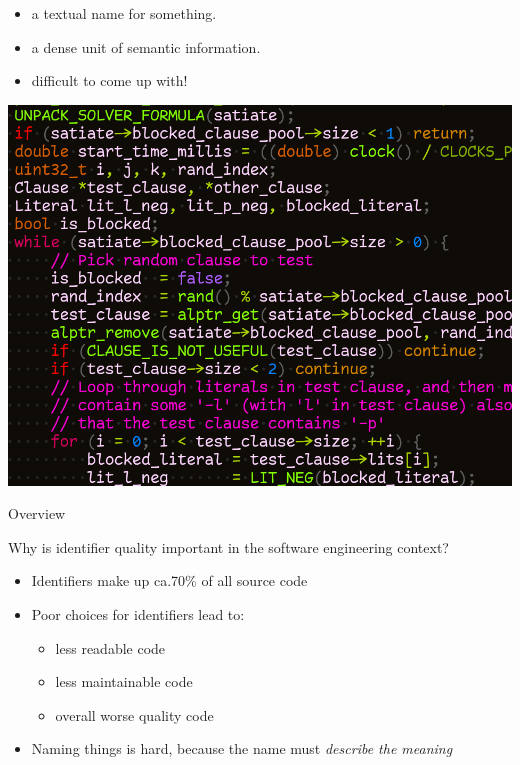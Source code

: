%
    {\begin{itemize}
        \setlength{\itemsep}{1.4ex}
        \item a textual name for something.
        \item a dense unit of semantic information.
        \item difficult to come up with!
    \end{itemize}}%
    {\includegraphics[height=\paperheight]{media/source-code.png}}

\begin{frame}{Overview}
    \begin{m-question}
        Why is identifier quality important in the software engineering context?
    \end{m-question}

    \pause %

    \begin{itemize}
        \item

        Identifiers make up ca.\@ 70\% of all source code~\cite{Gao2019IdentGen}

        \item

        Poor choices for identifiers lead to:

        \begin{tightlist}
            \begin{itemize}
            \item less readable code
            \item less maintainable code
            \item overall worse quality code~\cite{Butler2010Empirical}
            \end{itemize}
        \end{tightlist}

        \item

        Naming things is hard, because the name must \emph{describe the meaning}

    \end{itemize}
\end{frame}

